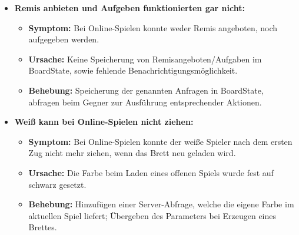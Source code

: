 \documentclass[parskip=full]{scrartcl}
\begin{document}
\begin{itemize}
\item{\textbf{Remis anbieten und Aufgeben funktionierten gar nicht:}}
\begin{itemize}
	\item{\textbf{Symptom:}} Bei Online-Spielen konnte weder Remis angeboten, noch aufgegeben werden.
	\item{\textbf{Ursache:}} Keine Speicherung von Remisangeboten/Aufgaben im BoardState, sowie fehlende Benachrichtigungsmöglichkeit.
	\item{\textbf{Behebung:}} Speicherung der genannten Anfragen in BoardState, abfragen beim Gegner zur Ausführung entsprechender Aktionen.
\end{itemize}

\item{\textbf{Weiß kann bei Online-Spielen nicht ziehen:}}
\begin{itemize}
	\item{\textbf{Symptom:}} Bei Online-Spielen konnte der weiße Spieler nach dem ersten Zug nicht mehr ziehen, wenn das Brett neu geladen wird.
	\item{\textbf{Ursache:}} Die Farbe beim Laden eines offenen Spiels wurde fest auf schwarz gesetzt.
	\item{\textbf{Behebung:}} Hinzufügen einer Server-Abfrage, welche die eigene Farbe im aktuellen Spiel liefert; Übergeben des Parameters bei Erzeugen eines Brettes.
\end{itemize}

\end{itemize}
\end{document}

